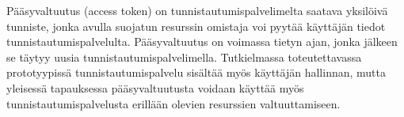 Pääsyvaltuutus (access token) on tunnistautumispalvelimelta saatava yksilöivä tunniste, jonka avulla suojatun resurssin omistaja voi pyytää käyttäjän tiedot tunnistautumispalvelulta. Pääsyvaltuutus on voimassa tietyn ajan, jonka jälkeen se täytyy uusia tunnistautumispalvelimella. Tutkielmassa toteutettavassa prototyypissä tunnistautumispalvelu sisältää myös käyttäjän hallinnan, mutta yleisessä tapauksessa pääsyvaltuutusta voidaan käyttää myös tunnistautumispalvelusta erillään olevien resurssien valtuuttamiseen.